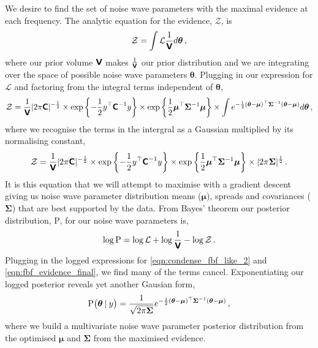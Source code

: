 We desire to find the set of noise wave parameters with the maximal evidence at each frequency. The analytic equation for the evidence, $\mathcal{Z}$, is
\begin{equation}
    \mathcal{Z} = \int \mathcal{L} \frac{1}{\textbf{\textsf{V}}} d\boldsymbol{\theta} \,,
    \label{eqn:fbf_evidence}
\end{equation}
where our prior volume $\textbf{\textsf{V}}$ makes $\frac{1}{\textbf{\textsf{V}}}$ our prior distribution and we are integrating over the space of possible noise wave parameters $\boldsymbol{\theta}$. Plugging in our expression for $\mathcal{L}$ and factoring from the integral terms independent of $\boldsymbol{\theta}$,
\begin{equation}
    \mathcal{Z} = \frac{1}{\textbf{\textsf{V}}} |2 \pi \textbf{\textsf{C}}|^{-\frac{1}{2}} \times \exp \left\{ -\frac{1}{2} y^{\top} \textbf{\textsf{C}}^{-1} y \right\} \times \exp \left\{ \frac{1}{2} \boldsymbol{\mu}^{\top} \bm{\Sigma}^{-1} \boldsymbol{\mu} \right\} \times \int e^{-\frac{1}{2} \left( \boldsymbol{\theta} - \boldsymbol{\mu} \right)^{\top} \bm{\Sigma}^{-1} \left( \boldsymbol{\theta} - \boldsymbol{\mu} \right)} d\boldsymbol{\theta} \,,
    \label{eqn:fbf_evidence_gauss}
\end{equation}
where we recognise the terms in the intergral as a Gaussian multiplied by its normalising constant,
\begin{equation}
    \mathcal{Z} = \frac{1}{\textbf{\textsf{V}}} |2 \pi \textbf{\textsf{C}}|^{-\frac{1}{2}} \times \exp \left\{ -\frac{1}{2} y^{\top} \textbf{\textsf{C}}^{-1} y \right\} \times \exp \left\{ \frac{1}{2} \boldsymbol{\mu}^{\top} \bm{\Sigma}^{-1} \boldsymbol{\mu} \right\} \times |2 \pi \bm{\Sigma}|^{\frac{1}{2}} \,.
    \label{eqn:fbf_evidence_final}
\end{equation}
It is this equation that we will attempt to maximise with a gradient descent giving us noise wave parameter distribution means ($\boldsymbol{\mu}$), spreads and covariances ($\bm{\Sigma}$) that are best supported by the data. From Bayes' theorem our posterior distribution, $\mathrm{P}$, for our noise wave parameters is,
\begin{equation}
    \log \mathrm{P} = \log \mathcal{L} + \log \frac{1}{\textbf{\textsf{V}}} - \log \mathcal{Z} \,.
\end{equation}
Plugging in the logged expressions for \cref{eqn:condense_fbf_like_2} and \cref{eqn:fbf_evidence_final}, we find many of the terms cancel. Exponentiating our logged posterior reveals yet another Gausian form,
\begin{equation}
    \mathrm{P} \big( \boldsymbol{\theta} \:\vert\: y \big)= \frac{1}{\sqrt{2 \pi \bm{\Sigma}}} e^{-\frac{1}{2} \left( \boldsymbol{\theta} - \boldsymbol{\mu} \right)^{\top} \bm{\Sigma}^{-1} \left( \boldsymbol{\theta} - \boldsymbol{\mu} \right)} \,,
    \label{eqn:fbf_posterior}
\end{equation}
where we build a multivariate noise wave parameter posterior distribution from the optimised $\boldsymbol{\mu}$ and $\bm{\Sigma}$ from the maximised evidence.

